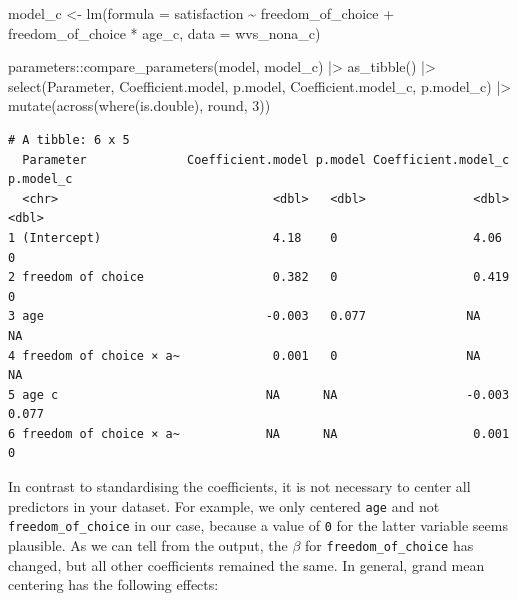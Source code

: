 \documentclass[
  letterpaper,
]{krantz}
\makeatletter
\newenvironment{Shaded}{\begin{snugshade}}{\end{snugshade}}
\newcommand{\AttributeTok}[1]{\textcolor[rgb]{0.40,0.45,0.13}{#1}}
\newcommand{\DecValTok}[1]{\textcolor[rgb]{0.68,0.00,0.00}{#1}}
\newcommand{\FunctionTok}[1]{\textcolor[rgb]{0.28,0.35,0.67}{#1}}
\newcommand{\NormalTok}[1]{\textcolor[rgb]{0.00,0.23,0.31}{#1}}
\newcommand{\OtherTok}[1]{\textcolor[rgb]{0.00,0.23,0.31}{#1}}
\newcommand{\SpecialCharTok}[1]{\textcolor[rgb]{0.37,0.37,0.37}{#1}}
\newenvironment{kframe}{%
\medskip{}
\setlength{\fboxsep}{.8em}
 \def\at@end@of@kframe{}%
 \ifinner\ifhmode%
  \def\at@end@of@kframe{\end{minipage}}%
  \begin{minipage}{\columnwidth}%
 \fi\fi%
 \def\FrameCommand##1{\hskip\@totalleftmargin \hskip-\fboxsep
 \colorbox{shadecolor}{##1}\hskip-\fboxsep
     \hskip-\linewidth \hskip-\@totalleftmargin \hskip\columnwidth}%
 \MakeFramed {\advance\hsize-\width
   \@totalleftmargin\z@ \linewidth\hsize
   \@setminipage}}%
 {\par\unskip\endMakeFramed%
 \at@end@of@kframe}
\renewenvironment{Shaded}{\begin{kframe}}{\end{kframe}}
\makeatother
\begin{document}
\begin{Shaded}
\begin{Highlighting}[]
\NormalTok{model\_c }\OtherTok{\textless{}{-}} \FunctionTok{lm}\NormalTok{(}\AttributeTok{formula =}\NormalTok{ satisfaction }\SpecialCharTok{\textasciitilde{}}
\NormalTok{                freedom\_of\_choice }\SpecialCharTok{+}
\NormalTok{                freedom\_of\_choice }\SpecialCharTok{*}\NormalTok{ age\_c,}
              \AttributeTok{data =}\NormalTok{ wvs\_nona\_c)}

\NormalTok{parameters}\SpecialCharTok{::}\FunctionTok{compare\_parameters}\NormalTok{(model, model\_c) }\SpecialCharTok{|\textgreater{}}
  \FunctionTok{as\_tibble}\NormalTok{() }\SpecialCharTok{|\textgreater{}}
  \FunctionTok{select}\NormalTok{(Parameter, Coefficient.model, p.model, Coefficient.model\_c, p.model\_c) }\SpecialCharTok{|\textgreater{}}
  \FunctionTok{mutate}\NormalTok{(}\FunctionTok{across}\NormalTok{(}\FunctionTok{where}\NormalTok{(is.double), round, }\DecValTok{3}\NormalTok{))}
\end{Highlighting}
\end{Shaded}

\begin{verbatim}
# A tibble: 6 x 5
  Parameter              Coefficient.model p.model Coefficient.model_c p.model_c
  <chr>                              <dbl>   <dbl>               <dbl>     <dbl>
1 (Intercept)                        4.18    0                   4.06      0    
2 freedom of choice                  0.382   0                   0.419     0    
3 age                               -0.003   0.077              NA        NA    
4 freedom of choice × a~             0.001   0                  NA        NA    
5 age c                             NA      NA                  -0.003     0.077
6 freedom of choice × a~            NA      NA                   0.001     0    
\end{verbatim}

In contrast to standardising the coefficients, it is not necessary to
center all predictors in your dataset. For example, we only centered
\texttt{age} and not \texttt{freedom\_of\_choice} in our case, because a
value of \texttt{0} for the latter variable seems plausible. As we can
tell from the output, the \(\beta\) for \texttt{freedom\_of\_choice} has
changed, but all other coefficients remained the same. In general, grand
mean centering has the following effects:
\end{document}

